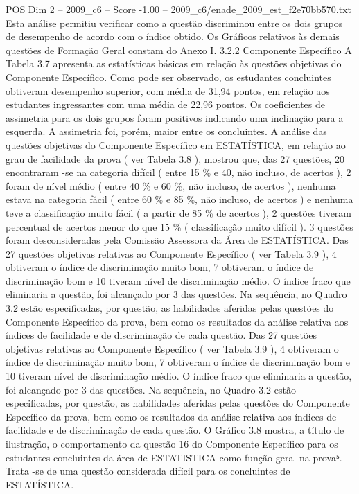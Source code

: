 \begin{textsample}{POS Dim 2 – 2009\_c6 – Score -1.00 – 2009\_c6/enade\_2009\_est\_f2e70bb570.txt}
Esta análise permitiu verificar como a questão discriminou entre os dois grupos de desempenho de acordo com o índice obtido.
Os Gráficos relativos às demais questões de Formação Geral constam do Anexo I. 3.2.2 Componente Específico A Tabela 3.7 apresenta as estatísticas básicas em relação às questões objetivas do Componente Específico.
Como pode ser observado, os estudantes concluintes obtiveram desempenho superior, com média de 31,94 pontos, em relação aos estudantes ingressantes com uma média de 22,96 pontos.
Os coeficientes de assimetria para os dois grupos foram positivos indicando uma inclinação para a esquerda.
A assimetria foi, porém, maior entre os concluintes.
A análise das questões objetivas do Componente Específico em ESTATÍSTICA, em relação ao grau de facilidade da prova ( ver Tabela 3.8 ), mostrou que, das 27 questões, 20 encontraram -se na categoria difícil ( entre 15 \% e 40, não incluso, de acertos ), 2 foram de nível médio ( entre 40 \% e 60 \%, não incluso, de acertos ), nenhuma estava na categoria fácil ( entre 60 \% e 85 \%, não incluso, de acertos ) e nenhuma teve a classificação muito fácil ( a partir de 85 \% de acertos ), 2 questões tiveram percentual de acertos menor do que 15 \% ( classificação muito difícil ). 3 questões foram desconsideradas pela Comissão Assessora da Área de ESTATÍSTICA.
Das 27 questões objetivas relativas ao Componente Específico ( ver Tabela 3.9 ), 4 obtiveram o índice de discriminação muito bom, 7 obtiveram o índice de discriminação bom e 10 tiveram nível de discriminação médio.
O índice fraco que eliminaria a questão, foi alcançado por 3 das questões.
Na sequência, no Quadro 3.2 estão especificadas, por questão, as habilidades aferidas pelas questões do Componente Específico da prova, bem como os resultados da análise relativa aos índices de facilidade e de discriminação de cada questão.
Das 27 questões objetivas relativas ao Componente Específico ( ver Tabela 3.9 ), 4 obtiveram o índice de discriminação muito bom, 7 obtiveram o índice de discriminação bom e 10 tiveram nível de discriminação médio.
O índice fraco que eliminaria a questão, foi alcançado por 3 das questões.
Na sequência, no Quadro 3.2 estão especificadas, por questão, as habilidades aferidas pelas questões do Componente Específico da prova, bem como os resultados da análise relativa aos índices de facilidade e de discriminação de cada questão.
O Gráfico 3.8 mostra, a título de ilustração, o comportamento da questão 16 do Componente Específico para os estudantes concluintes da área de ESTATISTICA como função geral na prova⁵.
Trata -se de uma questão considerada difícil para os concluintes de ESTATÍSTICA.

\end{textsample}
